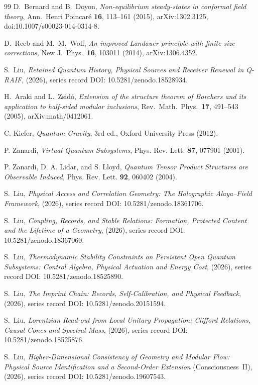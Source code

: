 \documentclass[12pt,a4paper]{article}
\begin{document}
\begin{thebibliography}{99}
D.~Bernard and B.~Doyon, \emph{Non-equilibrium steady-states in conformal field theory},
Ann.\ Henri Poincar\'e \textbf{16}, 113--161 (2015), arXiv:1302.3125,
doi:10.1007/s00023-014-0314-8.

D.~Reeb and M.~M.~Wolf, \emph{An improved Landauer principle with finite-size corrections}, New J.\ Phys.\ \textbf{16}, 103011 (2014), arXiv:1306.4352.

S.~Liu, \emph{Retained Quantum History, Physical Sources and Receiver Renewal in Q-RAIF}, (2026), series record DOI: 10.5281/zenodo.18528934.

H.~Araki and L.~Zsid\'o, \emph{Extension of the structure theorem of Borchers and its application to half-sided modular inclusions}, Rev.\ Math.\ Phys.\ \textbf{17}, 491--543 (2005), arXiv:math/0412061.

C. Kiefer, \emph{Quantum Gravity}, 3rd ed., Oxford University Press (2012).

P. Zanardi, \emph{Virtual Quantum Subsystems}, Phys. Rev. Lett. \textbf{87}, 077901 (2001).

P. Zanardi, D. A. Lidar, and S. Lloyd, \emph{Quantum Tensor Product Structures are Observable Induced}, Phys. Rev. Lett. \textbf{92}, 060402 (2004).

S.~Liu, \emph{Physical Access and Correlation Geometry: The Holographic Alaya--Field Framework}, (2026), series record DOI: 10.5281/zenodo.18361706.

S.~Liu, \emph{Coupling, Records, and Stable Relations: Formation, Protected Content and the Lifetime of a Geometry}, (2026), series record DOI: 10.5281/zenodo.18367060.

S.~Liu, \emph{Thermodynamic Stability Constraints on Persistent Open Quantum Subsystems: Control Algebra, Physical Actuation and Energy Cost}, (2026), series record DOI: 10.5281/zenodo.18525890.

S.~Liu, \emph{The Imprint Chain: Records, Self-Calibration, and Physical Feedback}, (2026), series record DOI: 10.5281/zenodo.20151594.

S.~Liu, \emph{Lorentzian Read-out from Local Unitary Propagation: Clifford Relations, Causal Cones and Spectral Mass}, (2026), series record DOI: 10.5281/zenodo.18525876.

S.~Liu, \emph{Higher-Dimensional Consistency of Geometry and Modular Flow: Physical Source Identification and a Second-Order Extension} (Consciousness~II), (2026), series record DOI: 10.5281/zenodo.19607543.


\end{thebibliography}
\end{document}
